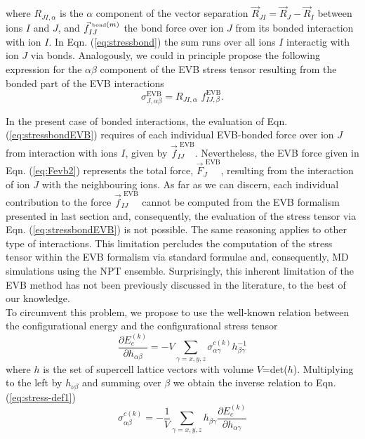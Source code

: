 where ${R}_{JI,\alpha}$ is the $\alpha$ component of the vector separation $\vec{R}_{JI}=\vec{R}_J-\vec{R}_I$ between ions $I$ and $J$, and $\vec{f}^{\text{\tiny{ bond}}(m)}_{IJ}$ the bond force over ion $J$ from its bonded interaction with ion $I$. In Eqn. (\ref{eq:stressbond}) the sum runs over all ions $I$ interactig with ion $J$ via bonds. Analogously, we could in principle propose the following expression for the $\alpha\beta$ component of the EVB stress tensor resulting from the bonded part of the EVB interactions
\begin{equation}\label{eq:stressbondEVB}
\sigma_{J,\alpha\beta}^{\text{EVB}}={R}_{JI,\alpha}\,\,{f}^{\text{EVB}}_{IJ,\beta}.
\end{equation}

In the present case of bonded interactions, the evaluation of Eqn. (\ref{eq:stressbondEVB}) requires of each individual EVB-bonded force over ion $J$ from interaction with ions $I$, given by $\vec{f}^{\text{ EVB}}_{IJ}$. Nevertheless, the EVB force given in Eqn. (\ref{eq:Fevb2}) represents the total force, $\vec{F}_{J}^{\text{ EVB}}$, resulting from the interaction of ion $J$ with the neighbouring ions. As far as we can discern, each individual contribution to the force $\vec{f}^{\text{ EVB}}_{IJ}$ cannot be computed from the EVB formalism presented in last section and, consequently, the evaluation of the stress tensor via Eqn. (\ref{eq:stressbondEVB}) is not possible. The same reasoning applies to other type of interactions. This limitation percludes the computation of the stress tensor within the EVB formalism via standard formulae and, consequently, MD simulations using the NPT ensemble. Surprisingly, this inherent limitation of the EVB method has not been previously discussed in the literature, to the best of our knowledge.\\
To circumvent this problem, we propose to use the well-known relation between the configurational energy and the configurational stress tensor \cite{essmann1995}
\begin{equation}\label{eq:stress-def1}
\frac{\partial E^{(k)}_{c}}{\partial h_{\alpha\beta}}=-V\sum_{\gamma=x,y,z}\sigma_{\alpha\gamma}^{c(k)}h^{-1}_{\beta\gamma}
\end{equation}
where $h$ is the set of supercell lattice vectors with volume $V$=det($h$). Multiplying to the left by $h_{\nu\beta}$ and summing over $\beta$ we obtain the inverse relation to Eqn. (\ref{eq:stress-def1})
\begin{equation}\label{eq:stress-def2}
\sigma_{\alpha\beta}^{c(k)}=-\frac{1}{V}\sum_{\gamma=x,y,z}h_{\beta\gamma}\frac{\partial E^{(k)}_{c}}{\partial h_{\alpha\gamma}}
\end{equation}
